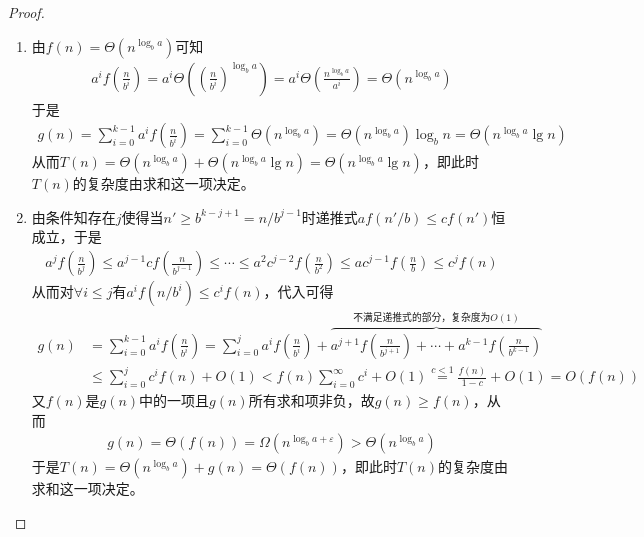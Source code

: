 \documentclass{ctexart}
\begin{document}
\begin{proof}
\begin{enumerate}
        \item 由$f(n) = \Theta (n^{\log_b a})$可知
              \begin{align*}
                  a^i f \left( \frac{n}{b^i} \right) = a^i \Theta \left( \left( \frac{n}{b^i} \right)^{\log_b a} \right) = a^i \Theta \left( \frac{n^{\log_b a}}{a^i} \right) = \Theta(n^{\log_b a})
              \end{align*}
              于是
              \begin{align*}
                  g(n) = \sum_{i=0}^{k-1} a^i f \left( \frac{n}{b^i} \right) = \sum_{i=0}^{k-1} \Theta(n^{\log_b a}) = \Theta(n^{\log_b a}) \log_b n = \Theta(n^{\log_b a} \lg n)
              \end{align*}
              从而$T(n) = \Theta(n^{\log_b a}) + \Theta(n^{\log_b a} \lg n) = \Theta(n^{\log_b a} \lg n)$，即此时$T(n)$的复杂度由求和这一项决定。

        \item 由条件知存在$j$使得当$n' \ge b^{k-j+1} = n / b^{j-1}$时递推式$a f(n'/b) \le c f(n')$恒成立，于是
              \begin{align*}
                  a^j f \left( \frac{n}{b^j} \right) \le a^{j-1} c f \left( \frac{n}{b^{j-1}} \right) \le \cdots \le a^2 c^{j-2} f \left( \frac{n}{b^2} \right) \le a c^{j-1} f \left( \frac{n}{b} \right) \le c^j f(n)
              \end{align*}
              从而对$\forall i \le j$有$a^i f(n/b^i) \le c^{i} f(n)$，代入可得
              \begin{align*}
                  g(n) & = \sum_{i=0}^{k-1} a^i f \left( \frac{n}{b^i} \right) = \sum_{i=0}^j a^i f \left( \frac{n}{b^i} \right) + \overbrace{a^{j+1} f \left(\frac{n}{b^{j+1}} \right) + \cdots + a^{k-1} f \left(\frac{n}{b^{k-1}} \right)}^{\text{不满足递推式的部分，复杂度为}O(1)} \\
                       & \le \sum_{i=0}^j c^i f(n) + O(1) < f(n) \sum_{i=0}^\infty c^i + O(1) \overset{c<1}{=} \frac{f(n)}{1-c} + O(1) = O(f(n))
              \end{align*}
              又$f(n)$是$g(n)$中的一项且$g(n)$所有求和项非负，故$g(n) \ge f(n)$，从而
              \begin{align*}
                  g(n) = \Theta (f(n)) = \Omega(n^{\log_b a + \varepsilon}) > \Theta(n^{\log_b a})
              \end{align*}
              于是$T(n) = \Theta(n^{\log_b a}) + g(n) = \Theta (f(n))$，即此时$T(n)$的复杂度由求和这一项决定。
    \end{enumerate}


\end{proof}
\end{document}
